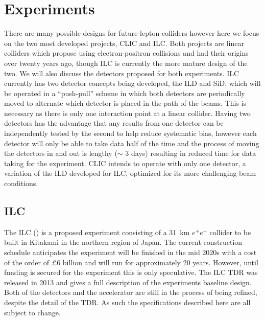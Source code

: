 \chapter{Experiments}
\label{experiments}
There are many possible designs for future lepton colliders \cite{Lipton:2012du,Koratzinos:2014cla,CEPC-SPPCStudyGroup:2015csa} however here we focus on the two most developed projects, \ac{CLIC} and \ac{ILC}. Both projects are linear colliders which propose using electron-positron collisions and had their origins over twenty years ago, though \ac{ILC} is currently the more mature design of the two. We will also discuss the detectors proposed for both experiments. \ac{ILC} currently has two detector concepts being developed, the \ac{ILD} and \ac{SiD}, which will be operated in a ``push-pull'' scheme in which both detectors are periodically moved to alternate which detector is placed in the path of the beams. This is necessary as there is only one interaction point at a linear collider. Having two detectors has the advantage that any results from one detector can be independently tested by the second to help reduce systematic bias, however each detector will only be able to take data half of the time and the process of moving the detectors in and out is lengthy ($\sim$ 3 days) resulting in reduced time for data taking for the experiment. \ac{CLIC} intends to operate with only one detector, a variation of the \ac{ILD} developed for \ac{ILC}, optimized for its more challenging beam conditions. 

\section{ILC}

The ILC\cite{ILCTDR} () is a proposed experiment consisting of a 31~km ${e^+e^-}$ collider to be built in Kitakami in the northern region of Japan. The current construction schedule anticipates the experiment will be finished in the mid 2020s with a cost of the order of \pounds6 billion and will run for approximately 20 years. However, until funding is secured for the experiment this is only speculative. The \ac{ILC} \ac{TDR} \cite{ILCTDR} was released in 2013 and gives a full description of the experiments baseline design. Both of the detectors and the accelerator are still in the process of being refined, despite the detail of the \ac{TDR}. As such the specifications described here are all subject to change.

